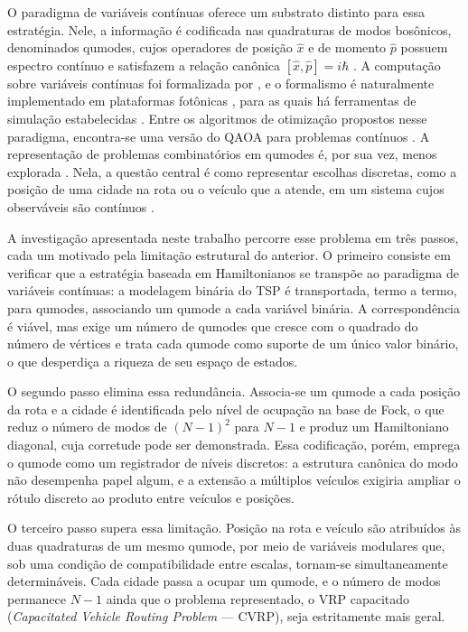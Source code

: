 O paradigma de variáveis contínuas oferece um substrato distinto para essa estratégia. Nele, a informação é codificada nas quadraturas de modos bosônicos, denominados qumodes, cujos operadores de posição $\hat{x}$ e de momento $\hat{p}$ possuem espectro contínuo e satisfazem a relação canônica $[\hat{x}, \hat{p}] = i\hbar$ \cite{weedbrook2012gaussian, braunstein2005quantum}. A computação sobre variáveis contínuas foi formalizada por \textcite{lloyd1999quantum}, e o formalismo é naturalmente implementado em plataformas fotônicas \cite{slussarenko2019photonic, fukui2022building}, para as quais há ferramentas de simulação estabelecidas \cite{killoran_strawberry_2019}. Entre os algoritmos de otimização propostos nesse paradigma, encontra-se uma versão do QAOA para problemas contínuos \cite{verdon2019quantum}. A representação de problemas combinatórios em qumodes é, por sua vez, menos explorada \cite{slysz2024solving, fingerhuth2018open}. Nela, a questão central é como representar escolhas discretas, como a posição de uma cidade na rota ou o veículo que a atende, em um sistema cujos observáveis são contínuos \cite{mcmahon2016fully}.

A investigação apresentada neste trabalho percorre esse problema em três passos, cada um motivado pela limitação estrutural do anterior. O primeiro consiste em verificar que a estratégia baseada em Hamiltonianos se transpõe ao paradigma de variáveis contínuas: a modelagem binária do TSP é transportada, termo a termo, para qumodes, associando um qumode a cada variável binária. A correspondência é viável, mas exige um número de qumodes que cresce com o quadrado do número de vértices e trata cada qumode como suporte de um único valor binário, o que desperdiça a riqueza de seu espaço de estados.

O segundo passo elimina essa redundância. Associa-se um qumode a cada posição da rota e a cidade é identificada pelo nível de ocupação na base de Fock, o que reduz o número de modos de $(N-1)^2$ para $N-1$ e produz um Hamiltoniano diagonal, cuja corretude pode ser demonstrada. Essa codificação, porém, emprega o qumode como um registrador de níveis discretos: a estrutura canônica do modo não desempenha papel algum, e a extensão a múltiplos veículos exigiria ampliar o rótulo discreto ao produto entre veículos e posições.

O terceiro passo supera essa limitação. Posição na rota e veículo são atribuídos às duas quadraturas de um mesmo qumode, por meio de variáveis modulares que, sob uma condição de compatibilidade entre escalas, tornam-se simultaneamente determináveis. Cada cidade passa a ocupar um qumode, e o número de modos permanece $N-1$ ainda que o problema representado, o VRP capacitado (\textit{Capacitated Vehicle Routing Problem} — CVRP), seja estritamente mais geral.

